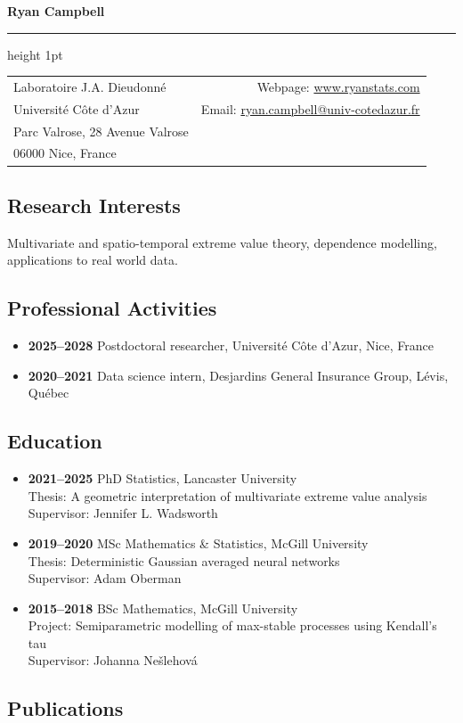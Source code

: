 \documentclass[11pt]{scrartcl}
\newcommand{\cvsection}[1]{\subsection*{#1}}
\begin{document}
{\LARGE \textbf{Ryan Campbell}\hfill}
\hrule height 1pt \vspace{1em}

\begin{tabularx}{\linewidth}{@{}Xr@{}}
    Laboratoire J.A. Dieudonné & Webpage: \url{www.ryanstats.com}\\
    Université Côte d'Azur & Email: \url{ryan.campbell@univ-cotedazur.fr} \\
    Parc Valrose, 28 Avenue Valrose & \\
    06000 Nice, France & 
\end{tabularx}
\vspace{1em}

\cvsection{Research Interests}
Multivariate and spatio-temporal extreme value theory, dependence modelling, applications to real world data.

\cvsection{Professional Activities}
\begin{itemize}[leftmargin=*,nosep]
    \item \textbf{2025--2028} Postdoctoral researcher, Université Côte d'Azur, Nice, France
    \item \textbf{2020--2021} Data science intern, Desjardins General Insurance Group, Lévis, Québec
\end{itemize}

\cvsection{Education}
\begin{itemize}[leftmargin=*,nosep]
    \item \textbf{2021--2025} PhD Statistics, Lancaster University \\
    Thesis: {A geometric interpretation of multivariate extreme value analysis} \\
    Supervisor: Jennifer L. Wadsworth

    \item \textbf{2019--2020} MSc Mathematics \& Statistics, McGill University \\
    Thesis: {Deterministic Gaussian averaged neural networks} \\
    Supervisor: Adam Oberman

    \item \textbf{2015--2018} BSc Mathematics, McGill University \\
    Project: {Semiparametric modelling of max-stable processes using Kendall's tau} \\
    Supervisor: Johanna Nešlehová
\end{itemize}

\cvsection{Publications}
\end{document}

